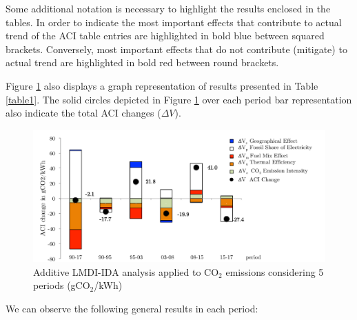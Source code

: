 \documentclass[energies,article,accept,moreauthors,12pt,a4paper]{mdpi} %
\begin{document}
         Some additional notation is necessary to highlight the results enclosed in the tables. In order to indicate the most important effects that contribute to actual trend of the ACI table entries are highlighted in bold blue between squared brackets. Conversely, most important effects that do not contribute (mitigate) to actual trend are highlighted in bold red between round brackets.
        



        
        

        
   Figure  \ref{main1} also displays a graph representation of results presented in Table \ref{table1}. The
solid circles depicted in Figure  \ref{main1} over each period bar representation also indicate the total ACI changes ($\Delta V$).


%

        \begin{figure}[H] \centerline{
       \includegraphics[width=15cm]{images/Figura4.pdf}}
       \caption{Additive LMDI-IDA analysis applied to CO$_2$ emissions considering 5 periods (gCO$_2$/kWh)}
      \label{main1}
        \end{figure}
        
        
We can observe the following general results in each period:
\end{document}
